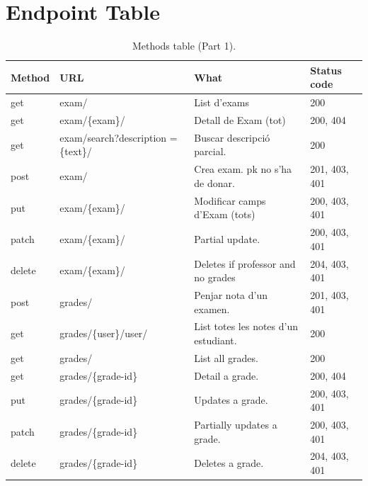 \documentclass[11pt]{article}
\begin{document}
\section{Endpoint Table}
\begin{table}[h!]
\caption{Methods table (Part 1).}
\centering
\begin{tabular}{lp{4cm}p{5.5cm}l}
\hline
Method & URL & What & Status code\\
\hline
get & exam/ & List d'exams & 200\\
get & exam/\{exam\}/ & Detall de Exam (tot) & 200, 404\\
get & exam/search?description =\{text\}/ & Buscar descripció parcial. & 200\\
post & exam/ & Crea exam. pk no s'ha de donar. & 201, 403, 401\\
put & exam/\{exam\}/ & Modificar camps d'Exam (tots) & 200, 403, 401\\
patch & exam/\{exam\}/ & Partial update. & 200, 403, 401\\
delete & exam/\{exam\}/ & Deletes if professor and no grades & 204, 403, 401\\
\hline
post & grades/ & Penjar nota d'un examen. & 201, 403, 401\\
get & grades/\{user\}/user/ & List totes les notes d'un estudiant. & 200\\
get & grades/ & List all grades. & 200\\
get & grades/\{grade-id\} & Detail a grade. & 200, 404\\
put & grades/\{grade-id\} & Updates a grade. & 200, 403, 401\\
patch & grades/\{grade-id\} & Partially updates a grade. & 200, 403, 401\\
delete & grades/\{grade-id\} & Deletes a grade. & 204, 403, 401\\
\hline
\end{tabular}
\end{table}
\end{document}
